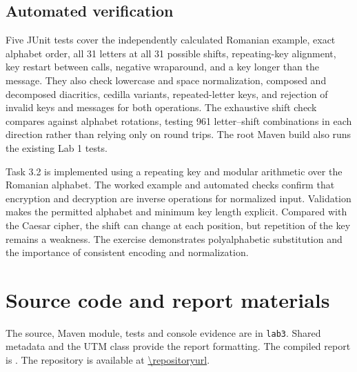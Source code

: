 \documentclass{utmreport}
\begin{document}
\section{Automated verification}
Five JUnit tests cover the independently calculated Romanian example, exact alphabet order, all 31 letters at all 31 possible shifts, repeating-key alignment, key restart between calls, negative wraparound, and a key longer than the message. They also check lowercase and space normalization, composed and decomposed diacritics, cedilla variants, repeated-letter keys, and rejection of invalid keys and messages for both operations. The exhaustive shift check compares against alphabet rotations, testing 961 letter--shift combinations in each direction rather than relying only on round trips. The root Maven build also runs the existing Lab 1 tests.

\utmconclusions
Task 3.2 is implemented using a repeating key and modular arithmetic over the Romanian alphabet. The worked example and automated checks confirm that encryption and decryption are inverse operations for normalized input. Validation makes the permitted alphabet and minimum key length explicit. Compared with the Caesar cipher, the shift can change at each position, but repetition of the key remains a weakness. The exercise demonstrates polyalphabetic substitution and the importance of consistent encoding and normalization.

\chapter*{Source code and report materials}
The source, Maven module, tests and console evidence are in \texttt{lab3}. Shared metadata and the UTM class provide the report formatting. The compiled report is . The repository is available at \url{\repositoryurl}.
\end{document}
